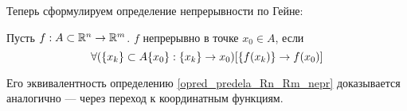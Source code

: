 Теперь сформулируем определение непрерывности по Гейне:

\begin{opr}
Пусть $f:A\subset\mathbb{R}^n\to\mathbb{R}^m$.
$f$ непрерывно в точке $x_0\in A$, если
$$
\forall(\{x_k\}\subset A\\\{x_0\}:\{x_k\}\to x_0)[\{f(x_k)\}\to f(x_0)]
$$
\end{opr}

Его эквивалентность определению \ref{opred_predela_Rn_Rm_nepr} доказывается аналогично --- через переход к координатным функциям.

